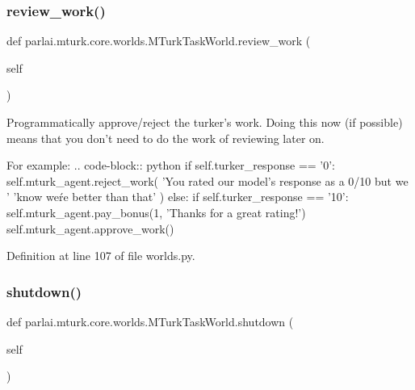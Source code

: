\mbox{\label{classparlai_1_1mturk_1_1core_1_1worlds_1_1MTurkTaskWorld_ac601ef19c221a1ec43ecbaa322ff67a4}} 
\subsubsection{\texorpdfstring{review\+\_\+work()}{review\_work()}}
{\footnotesize\ttfamily def parlai.\+mturk.\+core.\+worlds.\+M\+Turk\+Task\+World.\+review\+\_\+work (\begin{DoxyParamCaption}\item[{}]{self }\end{DoxyParamCaption})}

\begin{DoxyVerb}Programmatically approve/reject the turker's work. Doing this now
(if possible) means that you don't need to do the work of reviewing
later on.

For example:
.. code-block:: python
    if self.turker_response == '0':
self.mturk_agent.reject_work(
    'You rated our model's response as a 0/10 but we '
    'know we\'re better than that'
)
    else:
if self.turker_response == '10':
    self.mturk_agent.pay_bonus(1, 'Thanks for a great rating!')
self.mturk_agent.approve_work()
\end{DoxyVerb}
 

Definition at line 107 of file worlds.\+py.

\mbox{\label{classparlai_1_1mturk_1_1core_1_1worlds_1_1MTurkTaskWorld_a4c084c5ba931d4c241fc6f4046a8c5e8}} 
\subsubsection{\texorpdfstring{shutdown()}{shutdown()}}
{\footnotesize\ttfamily def parlai.\+mturk.\+core.\+worlds.\+M\+Turk\+Task\+World.\+shutdown (\begin{DoxyParamCaption}\item[{}]{self }\end{DoxyParamCaption})}

